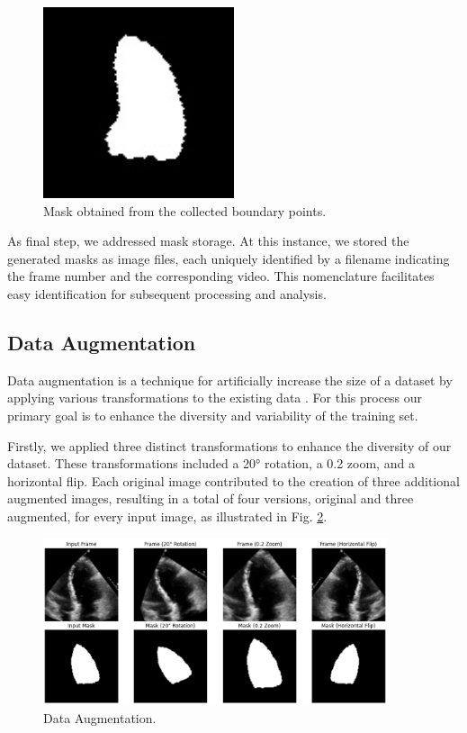 \documentclass[runningheads]{llncs}
\begin{document}
 \begin{figure}[H]
  \centering
  \includegraphics[width=0.5\textwidth]{binaryMask.jpg}
  \caption{Mask obtained from the collected boundary points.}
  \label{fig:second}
\end{figure}
 
As final step, we addressed mask storage. At this instance, we stored the generated masks as image files, each uniquely identified by a filename indicating the frame number and the corresponding video. This nomenclature facilitates easy identification for subsequent processing and analysis.


\subsection{Data Augmentation}
Data augmentation is a technique for artificially increase the size of a dataset by applying various transformations to the existing data \cite{augmentation}. For this process our primary goal is to enhance the diversity and variability of the training set. 

Firstly, we applied three distinct transformations to enhance the diversity of our dataset. These transformations included a 20° rotation, a 0.2 zoom, and a horizontal flip. Each original image contributed to the creation of three additional augmented images, resulting in a total of four versions, original and three augmented, for every input image, as illustrated in Fig. \ref{fig:DataAug}.

 \begin{figure}[H]
  \centering
  \includegraphics[width=0.9\textwidth]{DataAug.jpg}
  \caption{Data Augmentation.}
  \label{fig:DataAug}
\end{figure}
\end{document}
